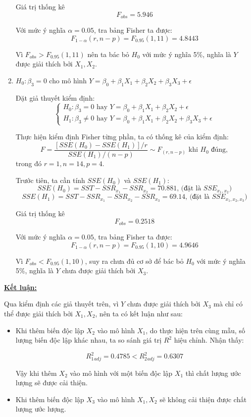 \documentclass[a4paper]{article}
\theoremstyle{nonumberplain}
\begin{document}
\begin{enumerate}[label=(\roman*)]
	Giá trị thống kê $$F_{obs} = 5.946$$
	
	Với mức ý nghĩa $\alpha = 0.05$, tra bảng Fisher ta được:
	$$F_{1-\alpha}(r,n-p) = F_{0.95}(1,11) = 4.8443$$
	
	Vì $F_{obs}>F_{0.95}(1,11)$ nên ta bác bỏ $H_0$ với mức ý nghĩa 5\%, nghĩa là $Y$ được giải thích bởi $X_1,X_2$.
	
	\item $H_0: \beta_3 = 0$ cho mô hình $Y = \beta_0 + \beta_1X_1 + \beta_2X_2 + \beta_3X_3 + \epsilon$
	
	Đặt giả thuyết kiểm định:
	\[\begin{cases}
		H_0 : \beta_3 = 0 \text{ hay } Y = \beta_0 + \beta_1 X_1 + \beta_2 X_2 + \epsilon \\
		H_1 : \beta_3 \ne 0 \text{ hay } Y = \beta_0 + \beta_1 X_1 + \beta_2 X_2 + \beta_3 X_3 + \epsilon 
	\end{cases}\]

	Thực hiện kiểm định Fisher từng phần, ta có thống kê của kiểm định: 
	$$F = \displaystyle \frac{\left [ SSE (H_0) - SSE(H_1) \right ] / r}{SSE(H_1)/(n-p)} \sim F_{(r,n-p)} \text{ khi } H_0 \text{ đúng},$$
	trong đó $r = 1, n = 14, p = 4$.
	
	Trước tiên, ta cần tính $SSE (H_0)$ và $SSE(H_1)$:
	$$SSE(H_0) = SST - SSR_{x_1} - SSR_{x_2} = 70.881 \text{, (đặt là }  SSE_{x_1,x_2}) $$
	$$SSE(H_1) = SST - SSR_{x_1} - SSR_{x_2} - SSR_{x_3} = 69.14 \text{, (đặt là }  SSE_{x_1,x_2,x_3})$$
	
	Giá trị thống kê $$F_{obs} = 0.2518$$
	
	Với mức ý nghĩa $\alpha = 0.05$, tra bảng Fisher ta được:
	$$F_{1-\alpha}(r,n-p) = F_{0.95}(1,10) = 4.9646$$
	
	Vì $F_{obs}<F_{0.95}(1,10)$, suy ra chưa đủ cơ sở để bác bỏ $H_0$ với mức ý nghĩa 5\%, nghĩa là $Y$ chưa được giải thích bởi $X_3$.
\end{enumerate}

\textbf{\underline{Kết luận:}}

Qua kiểm định các giả thuyết trên, vì $Y$ chưa được giải thích bởi $X_3$ mà chỉ có thể được giải thích bởi $X_1, X_2$, nên ta có kết luận như sau:
\begin{itemize}
	\item Khi thêm biến độc lập $X_2$ vào mô hình $X_1$, do thực hiện trên cùng mẫu, số lượng biến độc lập khác nhau, ta so sánh giá trị $R^2$ hiệu chỉnh. Nhận thấy:
	
	\[R^2_1_{adj} = 0.4785 < R^2_2_{adj} = 0.6307\]
	
	Vậy khi thêm $X_2$ vào mô hình với một biến độc lập $X_1$ thì chất lượng ước lượng sẽ được cải thiện.
	
	\item Khi thêm biến độc lập $X_3$ vào mô hình $X_1,X_2$ sẽ không cải thiện được chất lượng ước lượng.
\end{itemize}
\end{document}
